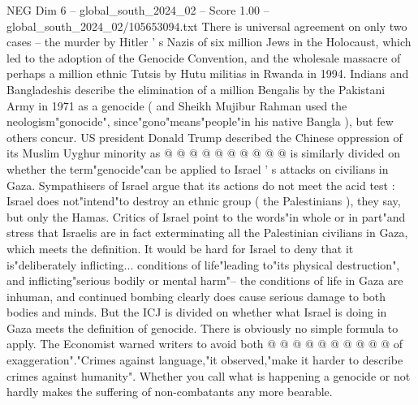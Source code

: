 \begin{textsample}{NEG Dim 6 – global\_south\_2024\_02 – Score 1.00 – global\_south\_2024\_02/105653094.txt}
There is universal agreement on only two cases -- the murder by Hitler ' s Nazis of six million Jews in the Holocaust, which led to the adoption of the Genocide Convention, and the wholesale massacre of perhaps a million ethnic Tutsis by Hutu militias in Rwanda in 1994.
Indians and Bangladeshis describe the elimination of a million Bengalis by the Pakistani Army in 1971 as a genocide ( and Sheikh Mujibur Rahman used the neologism"gonocide", since"gono"means"people"in his native Bangla ), but few others concur.
US president Donald Trump described the Chinese oppression of its Muslim Uyghur minority as @ @ @ @ @ @ @ @ @ @ is similarly divided on whether the term"genocide"can be applied to Israel ' s attacks on civilians in Gaza.
Sympathisers of Israel argue that its actions do not meet the acid test : Israel does not"intend"to destroy an ethnic group ( the Palestinians ), they say, but only the Hamas.
Critics of Israel point to the words"in whole or in part"and stress that Israelis are in fact exterminating all the Palestinian civilians in Gaza, which meets the definition.
It would be hard for Israel to deny that it is"deliberately inflicting... conditions of life"leading to"its physical destruction", and inflicting"serious bodily or mental harm"-- the conditions of life in Gaza are inhuman, and continued bombing clearly does cause serious damage to both bodies and minds.
But the ICJ is divided on whether what Israel is doing in Gaza meets the definition of genocide.
There is obviously no simple formula to apply.
The Economist warned writers to avoid both @ @ @ @ @ @ @ @ @ @ of exaggeration"."Crimes against language,"it observed,"make it harder to describe crimes against humanity".
Whether you call what is happening a genocide or not hardly makes the suffering of non-combatants any more bearable.

\end{textsample}
